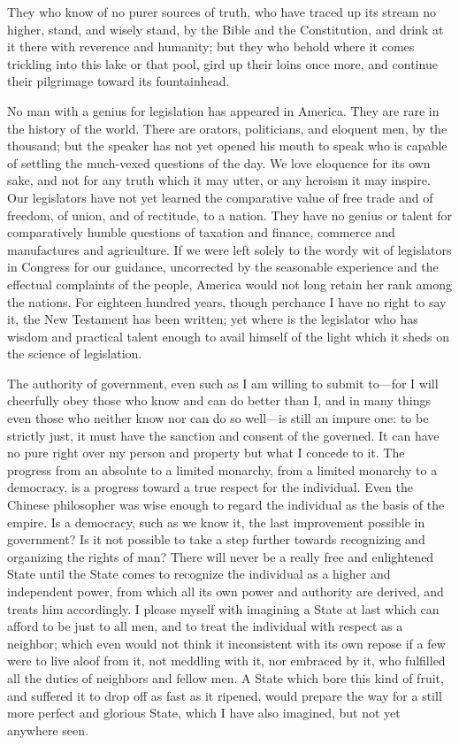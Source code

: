 \documentclass[12pt]{article}
\begin{document}
They who know of no purer sources of truth, who have traced up its
stream no higher, stand, and wisely stand, by the Bible and the
Constitution, and drink at it there with reverence and humanity; but
they who behold where it comes trickling into this lake or that pool,
gird up their loins once more, and continue their pilgrimage toward its
fountainhead.

No man with a genius for legislation has appeared in America. They are
rare in the history of the world. There are orators, politicians, and
eloquent men, by the thousand; but the speaker has not yet opened his
mouth to speak who is capable of settling the much-vexed questions of
the day. We love eloquence for its own sake, and not for any truth which
it may utter, or any heroism it may inspire. Our legislators have not
yet learned the comparative value of free trade and of freedom, of
union, and of rectitude, to a nation. They have no genius or talent for
comparatively humble questions of taxation and finance, commerce and
manufactures and agriculture. If we were left solely to the wordy wit of
legislators in Congress for our guidance, uncorrected by the seasonable
experience and the effectual complaints of the people, America would not
long retain her rank among the nations. For eighteen hundred years,
though perchance I have no right to say it, the New Testament has been
written; yet where is the legislator who has wisdom and practical talent
enough to avail himself of the light which it sheds on the science of
legislation.

The authority of government, even such as I am willing to submit
to---for I will cheerfully obey those who know and can do better than I,
and in many things even those who neither know nor can do so well---is
still an impure one: to be strictly just, it must have the sanction and
consent of the governed. It can have no pure right over my person and
property but what I concede to it. The progress from an absolute to a
limited monarchy, from a limited monarchy to a democracy, is a progress
toward a true respect for the individual. Even the Chinese philosopher
was wise enough to regard the individual as the basis of the empire. Is
a democracy, such as we know it, the last improvement possible in
government? Is it not possible to take a step further towards
recognizing and organizing the rights of man? There will never be a
really free and enlightened State until the State comes to recognize the
individual as a higher and independent power, from which all its own
power and authority are derived, and treats him accordingly. I please
myself with imagining a State at last which can afford to be just to all
men, and to treat the individual with respect as a neighbor; which even
would not think it inconsistent with its own repose if a few were to
live aloof from it, not meddling with it, nor embraced by it, who
fulfilled all the duties of neighbors and fellow men. A State which bore
this kind of fruit, and suffered it to drop off as fast as it ripened,
would prepare the way for a still more perfect and glorious State, which
I have also imagined, but not yet anywhere seen.
\end{document}

